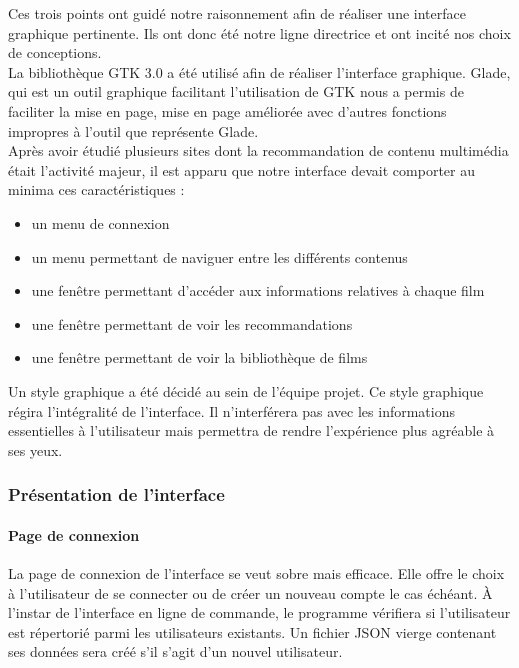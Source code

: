 \documentclass{article}
\begin{document}
Ces trois points ont guidé notre raisonnement afin de réaliser une interface graphique pertinente. Ils ont donc été notre ligne directrice et ont incité nos choix de conceptions. \\

La bibliothèque GTK 3.0 a été utilisé afin de réaliser l'interface graphique. Glade, qui est un outil graphique facilitant l’utilisation de GTK nous a permis de faciliter la mise en page, mise en page améliorée avec d'autres fonctions impropres à l'outil que représente Glade. \\

Après avoir étudié plusieurs sites dont la recommandation de contenu multimédia était l'activité majeur, il est apparu que notre interface devait comporter au minima ces caractéristiques :
\begin{itemize}
    \item un menu de connexion
    \item un menu permettant de naviguer entre les différents contenus
    \item une fenêtre permettant d'accéder aux informations relatives à chaque film
    \item une fenêtre permettant de voir les recommandations
    \item une fenêtre permettant de voir la bibliothèque de films
\end{itemize}



Un style graphique a été décidé au sein de l'équipe projet. Ce style graphique régira l'intégralité de l'interface. Il n'interférera pas avec les informations essentielles à l'utilisateur mais permettra de rendre l'expérience plus agréable à ses yeux.

\subsubsection{Présentation de l'interface}

\paragraph{Page de connexion}


La page de connexion de l'interface se veut sobre mais efficace. Elle offre le choix à l'utilisateur de se connecter ou de créer un nouveau compte le cas échéant. À l'instar de l'interface en ligne de commande, le programme vérifiera si l'utilisateur est répertorié parmi les utilisateurs existants. Un fichier JSON vierge contenant ses données sera créé s'il s'agit d'un nouvel utilisateur.
\end{document}
